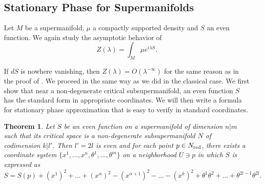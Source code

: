 \documentclass[11pt]{amsart}
\numberwithin{equation}{section}
\numberwithin{figure}{section}
\theoremstyle{plain}
\newtheorem{thm}{Theorem}[subsection]
\theoremstyle{definition}
\theoremstyle{remark}
\begin{document}
\subsection{Stationary Phase for Supermanifolds}

Let $M$ be a supermanifold, $\mu$ a compactly supported density
and $S$ an even function. We again study the asymptotic behavior
of 
\[
Z(\lambda)=\int_{M}\mu e^{i\lambda S}.
\]


If $dS$ is nowhere vanishing, then $Z(\lambda)=O(\lambda^{-\infty})$
for the same reason as in the proof of .
We proceed in the same way as we did in the classical case. We first
show that near a non-degenerate critical subsupermanifold, an even
function $S$ has the standard form in appropriate coordinates. We
will then write a formula for stationary phase approximation that
is easy to verify in standard coordinates.
\begin{thm}
\label{thm:super_morse_bott1} Let $S$ be an even function on a supermanifold
of dimension $n|m$ such that its critical space is a non-degenerate
subsupermanifold $N$ of codimension $k|l'$. Then $l'=2l$ is even
and for each point $p\in N_{\mathrm{red}}$, there exists a coordinate system
$\{x^{1},\dots,x^{n},\theta^{1},\dots,\theta^{m}\}$ on a neighborhood
$U\ni p$ in which $S$ is expressed as
\[
S=S(p)+\left(x^{1}\right)^{2}+\dots+\left(x^{\alpha}\right)^{2}-\left(x^{\alpha+1}\right)^{2}-\dots-\left(x^{k}\right)^{2}+\theta^{1}\theta^{2}+\dots+\theta^{2l-1}\theta^{2l}.
\]
\end{thm}
\end{document}
